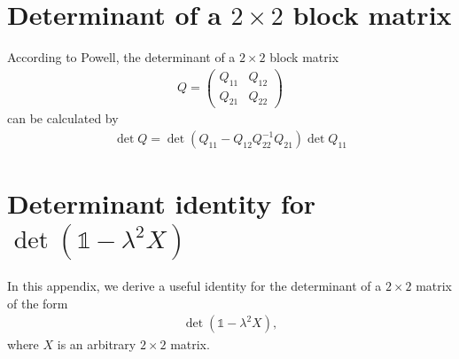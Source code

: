 \documentclass[%
 reprint,
 amsmath,amssymb,
 aps,
twocolumn
]{revtex4-2}
\begin{document}
\section{Determinant of a $2\times2$ block matrix}
According to Powell\cite{powell2011blockdet}, the determinant of a $2\times2$ block matrix 
\begin{align}
Q=
\begin{pmatrix}
Q_{11} & Q_{12}\\[2mm]
Q_{21} & Q_{22}
\end{pmatrix}
\end{align}
can be calculated by
\begin{align}\label{appendix:det_of_blockmatrix}
\det Q = \det(Q_{11}-Q_{12}Q_{22}^{-1}Q_{21})\det Q_{11}
\end{align}

\section{Determinant identity for \texorpdfstring{$\det(\mathbb{1}-\lambda^2 X)$}{det(I-lambda²X)}}\label{appendix:det_identity}

In this appendix, we derive a useful identity for the determinant of a $2\times 2$ matrix of the form
\begin{align}
\det(\mathbb{1}-\lambda^2 X),
\end{align}
where $X$ is an arbitrary $2\times2$ matrix.
\end{document}
